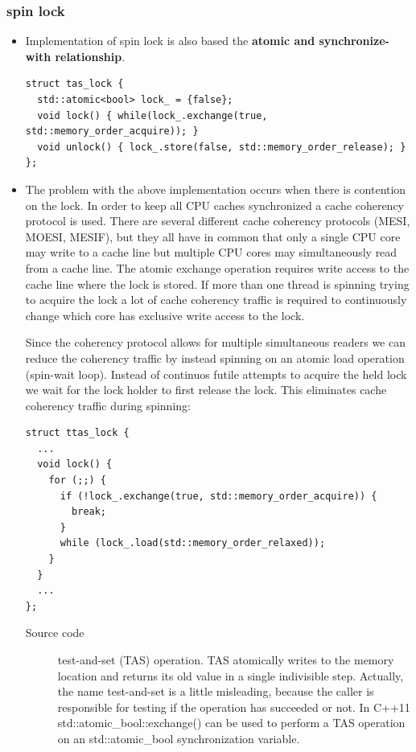 \documentclass[a4paper,11pt,twoside]{book}
\begin{document}
\subsubsection{spin lock}
\begin{itemize}
    \item Implementation of spin lock is also based the \textbf{atomic and synchronize-with relationship}. 
\begin{lstlisting}[]
struct tas_lock {
  std::atomic<bool> lock_ = {false};
  void lock() { while(lock_.exchange(true, std::memory_order_acquire)); }
  void unlock() { lock_.store(false, std::memory_order_release); }
};
\end{lstlisting}
    \item The problem with the above implementation occurs when there is contention on the lock. In order to keep all CPU caches synchronized a cache coherency protocol is used. There are several different cache coherency protocols (MESI, MOESI, MESIF), but they all have in common that only a single CPU core may write to a cache line but multiple CPU cores may simultaneously read from a cache line. The atomic exchange operation requires write access to the cache line where the lock is stored. If more than one thread is spinning trying to acquire the lock a lot of cache coherency traffic is required to continuously change which core has exclusive write access to the lock.

Since the coherency protocol allows for multiple simultaneous readers we can reduce the coherency traffic by instead spinning on an atomic load operation (spin-wait loop). Instead of continuos futile attempts to acquire the held lock we wait for the lock holder to first release the lock. This eliminates cache coherency traffic during spinning:
\begin{lstlisting}[]
struct ttas_lock {
  ...
  void lock() {
    for (;;) {
      if (!lock_.exchange(true, std::memory_order_acquire)) {
        break;
      }
      while (lock_.load(std::memory_order_relaxed));
    }
  }
  ...
};
\end{lstlisting}
\begin{description}
    \item[Source code] test-and-set (TAS) operation. TAS atomically writes to the memory location and returns its old value in a single indivisible step. Actually, the name test-and-set is a little misleading, because the caller is responsible for testing if the operation has succeeded or not. In C++11 std::atomic\_bool::exchange() can be used to perform a TAS operation on an std::atomic\_bool synchronization variable. 
\end{description}

\end{itemize}
\end{document}
